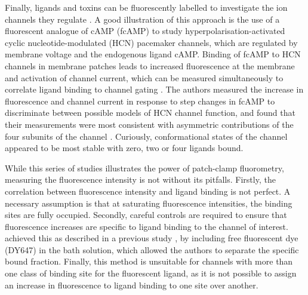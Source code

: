 Finally, ligands and toxins can be fluorescently labelled to investigate the ion channels they regulate \cite{zheng_handbook_2015, braun_current_2020}.
A good illustration of this approach is the use of a fluorescent analogue of cAMP (fcAMP) to study hyperpolarisation-activated cyclic nucleotide-modulated (HCN) pacemaker channels, which are regulated by membrane voltage and the endogenous ligand cAMP.
Binding of fcAMP to HCN channels in membrane patches leads to increased fluorescence at the membrane and activation of channel current, which can be measured simultaneously to correlate ligand binding to channel gating \cite{kusch_interdependence_2010-1, kusch_how_2012, thon_conformational_2015}.
The authors measured the increase in fluorescence and channel current in response to step changes in fcAMP to discriminate between possible models of HCN channel function, and found that their measurements were most consistent with asymmetric contributions of the four subunits of the channel \cite{kusch_how_2012}.
Curiously, conformational states of the channel appeared to be most stable with zero, two or four ligands bound.

While this series of studies illustrates the power of patch-clamp fluorometry, measuring the fluorescence intensity is not without its pitfalls.
Firstly, the correlation between fluorescence intensity and ligand binding is not perfect.
A necessary assumption is that at saturating fluorescence intensities, the binding sites are fully occupied.
Secondly, careful controls are required to ensure that fluorescence increases are specific to ligand binding to the channel of interest.
\citeauthor{kusch_interdependence_2010-1} achieved this as described in a previous study \cite{biskup_relating_2007}, by including free fluorescent dye (DY647) in the bath solution, which allowed the authors to separate the specific bound fraction.
Finally, this method is unsuitable for channels with more than one class of binding site for the fluorescent ligand, as it is not possible to assign an increase in fluorescence to ligand binding to one site over another.